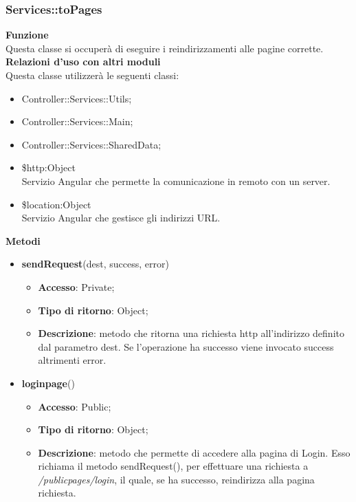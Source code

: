 {{		\subsubsection{Services::\-toPages}{
			\label{sub:servicestoPages}
			\textbf{Funzione}\\
			\indent Questa classe si occuperà di eseguire i reindirizzamenti alle pagine corrette.\\
			\textbf{Relazioni d'uso con altri moduli}\\
			\indent Questa classe utilizzerà le seguenti classi:
			\begin{itemize}
				\item Controller::Services::\-Utils;
				\item Controller::Services::\-Main;
				\item Controller::Services::\-SharedData;
				\item \$http:Object\\
					\indent Servizio Angular che permette la comunicazione in remoto con un server.
				\item \$location:Object\\
					\indent Servizio Angular che gestisce gli indirizzi URL.
			\end{itemize}
			\textbf{Metodi}
			\begin{itemize}
				\item \textbf{sendRequest}(dest, success, error)
				\begin{itemize}
					\item \textbf{Accesso}: Private;
					\item \textbf{Tipo di ritorno}: Object;
					\item \textbf{Descrizione}: metodo che ritorna una richiesta http all'indirizzo definito dal parametro dest. Se l'operazione ha successo viene invocato success altrimenti error.
				\end{itemize}
				\item \textbf{loginpage}()
				\begin{itemize}
					\item \textbf{Accesso}: Public;
					\item \textbf{Tipo di ritorno}: Object;
					\item \textbf{Descrizione}: metodo che permette di accedere alla pagina di Login. Esso richiama il metodo sendRequest(), per effettuare una richiesta a \textit{/publicpages/login}, il quale, se ha successo, reindirizza alla pagina richiesta.
				\end{itemize}

\end{itemize}}}}
